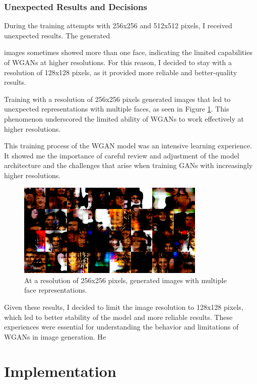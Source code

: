 \documentclass[a4paper, 12pt]{article}
\begin{document}
\subsubsection{Unexpected Results and Decisions}
During the training attempts with 256x256 and 512x512 pixels, I received unexpected results. The generated

 images sometimes showed more than one face, indicating the limited capabilities of WGANs at higher resolutions. For this reason, I decided to stay with a resolution of 128x128 pixels, as it provided more reliable and better-quality results.

Training with a resolution of 256x256 pixels generated images that led to unexpected representations with multiple faces, as seen in Figure \ref{fig:multiple_faces}. This phenomenon underscored the limited ability of WGANs to work effectively at higher resolutions.

This training process of the WGAN model was an intensive learning experience. It showed me the importance of careful review and adjustment of the model architecture and the challenges that arise when training GANs with increasingly higher resolutions.

\begin{figure}[ht]
\centering
\includegraphics[width=0.8\textwidth]{./img/256x256.png}
\caption{At a resolution of 256x256 pixels, generated images with multiple face representations.}
\label{fig:multiple_faces}
\end{figure}

Given these results, I decided to limit the image resolution to 128x128 pixels, which led to better stability of the model and more reliable results. These experiences were essential for understanding the behavior and limitations of WGANs in image generation.
He

\section{Implementation}
\end{document}
